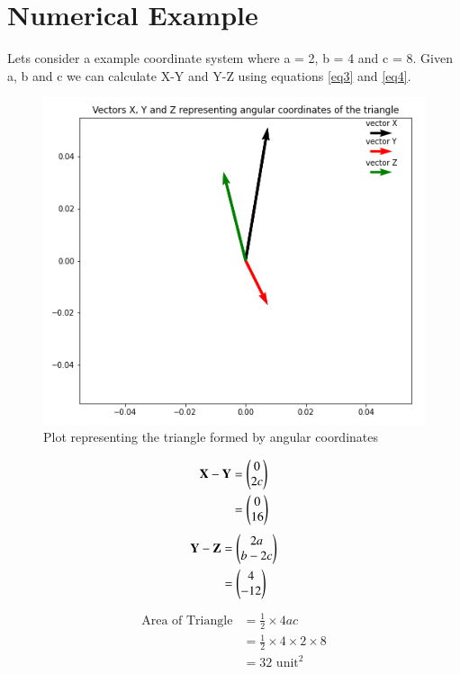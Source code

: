 \documentclass[journal,12pt]{IEEEtran}
\begin{document}
\section{Numerical Example}
Lets consider a example coordinate system where a = 2, b = 4 and c = 8. Given a, b and c we can calculate X-Y and Y-Z using equations \ref{eq3} and \ref{eq4}.\\
\begin{figure}[h]
	\centering
	\includegraphics[scale=0.4]{Vectors_Fig.png}
	\caption{Plot representing the triangle formed by angular coordinates}
\end{figure}
\begin{align}
\begin{split}
\mathbf{X-Y} & = \begin{pmatrix}0\\2c\end{pmatrix} \\
& = \begin{pmatrix}0\\16\end{pmatrix}
\end{split}
\label{eq7}
\end{align}
\begin{align}
\begin{split}
\mathbf{Y-Z} & = \begin{pmatrix}2a\\b-2c\end{pmatrix} \\
& = \begin{pmatrix}4\\-12\end{pmatrix}
\end{split}
\label{eq8}
\end{align}
\begin{align}
\begin{split}
\text{Area of Triangle} & = \frac{1}{2} \times 4ac \\
& = \frac{1}{2} \times 4 \times 2 \times 8 \\
& = 32 \text{ unit}^2
\end{split}
\label{eq9}
\end{align}
\end{document}
